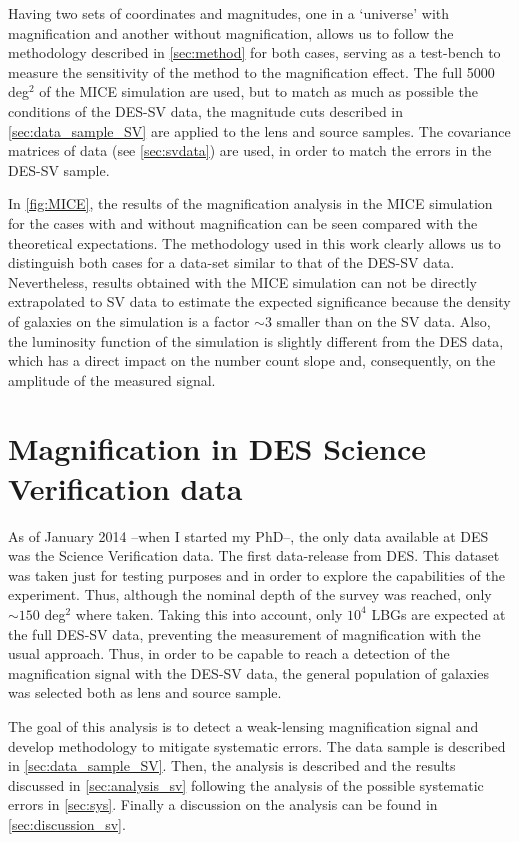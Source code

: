 Having two sets of coordinates and magnitudes, one in a `universe' with magnification and another without magnification, allows us to follow the methodology described in \autoref{sec:method} for both cases,
serving as a test-bench to measure the sensitivity of the method to the magnification effect. The full 5000 deg$^2$ of the MICE simulation are used, but to match as much as possible the conditions of the DES-SV data, the magnitude cuts described in \autoref{sec:data_sample_SV} are applied to the lens and source samples. The covariance matrices of data (see \autoref{sec:svdata}) are used, in order to match the errors in the DES-SV sample.

In \autoref{fig:MICE}, the results of the magnification analysis in the MICE simulation for the cases with and without magnification can be seen compared with the theoretical expectations. The methodology used in this work clearly allows us to distinguish both cases for a data-set similar to that of the DES-SV data. Nevertheless, results obtained with the MICE simulation can not be directly extrapolated to SV data to estimate the expected significance because the density of galaxies on the simulation is a factor $\sim3$ smaller than on the SV data. Also, the luminosity function of the simulation is slightly different from the DES data, which has a direct impact on the number count slope and, consequently, on the amplitude of the measured signal.


\section{Magnification in DES Science Verification data}
\label{sec:svdata}
As of January 2014 --when I started my PhD--, the only data available at DES was the Science Verification data. The first data-release from DES. This dataset was taken just for testing purposes and in order to explore the capabilities of the experiment. Thus, although the nominal depth of the survey was reached, only $\sim 150$ deg$^2$ where taken. Taking this into account, only $10^4$ LBGs are expected at the full DES-SV data, preventing the measurement of magnification with the usual approach. Thus, in order to be capable to reach a detection of the magnification signal with the DES-SV data, the general population of galaxies was selected both as lens and source sample.
\newline

The goal of this analysis is to detect a weak-lensing magnification signal and develop methodology to mitigate systematic errors. The data sample is described in \autoref{sec:data_sample_SV}. Then, the analysis is described and the results discussed in \autoref{sec:analysis_sv} following the analysis of the possible systematic errors in \autoref{sec:sys}. Finally a discussion on the analysis can be found in \autoref{sec:discussion_sv}.

